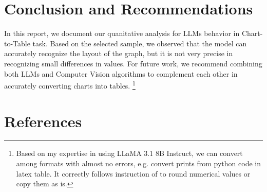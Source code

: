 \documentclass[
	letterpaper, %
]{jdf}
\begin{document}
\section{Conclusion and Recommendations}\label{sect:conclusion}
In this report, we document our quanitative analysis for LLMs behavior in Chart-to-Table task.
Based on the selected sample, we observed that the model can accurately recognize the layout of the graph, but it is not very precise in recognizing small differences in values.
For future work, we recommend combining both LLMs and Computer Vision algorithms to complement each other in accurately converting charts into tables.
\footnote{Based on my expertise in using LLaMA 3.1 8B Instruct, we can convert among formats with almost no errors, e.g. convert prints from python code in latex table. It correctly follows instruction of to round numerical values or copy them as is.}
\section{References}
\printbibliography[heading=none]
\end{document}

